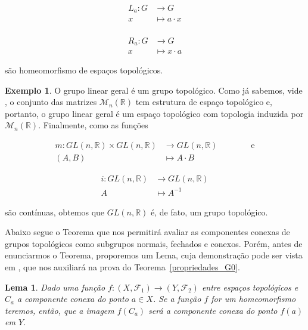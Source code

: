 \documentclass[twoside,openright,titlepage,numbers=noenddot,headinclude,  lineheaders footinclude=true,cleardoublepage=empty,
                                BCOR=5mm,paper=a4,fontsize=12pt ]{scrbook}
\newtheorem{lema}[teo]{Lema}
\theoremstyle{definition}
\newtheorem{exmp}{Exemplo}[section]
\begin{document}
\begin{minipage}{0.5\linewidth}
\centering
\begin{align*}
L_a:G  & \rightarrow G \\
  x    & \mapsto a \cdot x   \\
\end{align*}
\end{minipage}%
\begin{minipage}{0.5\linewidth}
\centering
\begin{align*}
R_a:G  & \rightarrow G \\
  x    & \mapsto x \cdot a  
\end{align*}

\end{minipage}
são homeomorfismo de espaços topológicos.

\begin{exmp}
O grupo linear geral é um grupo topológico. 
Como já sabemos, vide \cite{elon}, o conjunto das matrizes $\mathcal{M}_n(\mathbb{R})$ tem estrutura de 
espaço topológico e, portanto,
o grupo linear geral é um espaço topológico com topologia induzida por $\mathcal{M}_n(\mathbb{R})$. Finalmente,
como as funções\\
\begin{minipage}{.5\textwidth}
\centering
\begin{align*}
m: GL(n, \mathbb{R}) \times GL(n, \mathbb{R}) &\rightarrow GL(n, \mathbb{R}) \qquad \qquad \text{e} \\
 (A, B) & \mapsto A \cdot B
\end{align*}
\end{minipage}%
\begin{minipage}{.5\textwidth}
\centering
\begin{align*}
i: GL(n, \mathbb{R}) &\rightarrow GL(n, \mathbb{R})\\
 A & \mapsto A^{-1}
\end{align*}

\end{minipage}
são contínuas, obtemos que $GL(n, \mathbb{R})$ é, de fato, um grupo topológico.
\end{exmp}

Abaixo segue o Teorema que nos permitirá avaliar as componentes conexas de grupos topológicos como
subgrupos normais, fechados e conexos. Porém, antes de enunciarmos o Teorema, proporemos
um Lema, cuja demonstração pode ser vista em \cite{elon}, que nos auxiliará na prova do
Teorema~\ref{propriedades_G0}.
\begin{lema} \label{homeo_comp}
Dado uma função $f: (X, \mathcal{F}_1) \rightarrow (Y, \mathcal{F}_2)$ entre espaços topológicos e $C_a$ 
a componente conexa do ponto $a \in X$.
Se a função $f$ for um homeomorfismo teremos, então, que a imagem $f(C_a)$ será a componente conexa do ponto $f(a)$ em $Y$.
\end{lema}
\end{document}
